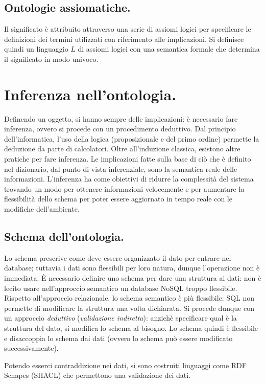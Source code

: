 \documentclass[11pt]{article}
\begin{document}
\begin{multicols}{2}
\subsection{Ontologie assiomatiche.}
Il significato è attribuito attraverso una serie di assiomi logici per specificare le definizioni dei termini utilizzati con riferimento alle implicazioni.
Si definisce quindi un linguaggio $L$ di assiomi logici con una semantica formale che determina il significato in modo univoco.

\section{Inferenza nell'ontologia.}
Definendo un oggetto, si hanno sempre delle implicazioni: è necessario fare inferenza, ovvero si procede con un procedimento deduttivo.
Dal principio dell'informatica, l'uso della logica (proposizionale e del primo ordine) permette la deduzione da parte di calcolatori.
Oltre all'induzione classica, esistono altre pratiche per fare inferenza.
Le implicazioni fatte sulla base di ciò che è definito nel dizionario, dal punto di vista inferenziale, sono la semantica reale delle informazioni.
L'inferenza ha come obiettivi di ridurre la complessità del sistema trovando un modo per ottenere informazioni velocemente e per aumentare la flessibilità dello schema per poter essere aggiornato in tempo reale con le modifiche dell'ambiente.

\subsection{Schema dell'ontologia.}
Lo schema prescrive come deve essere organizzato il dato per entrare nel database; tuttavia i dati sono flessibili per loro natura, dunque l'operazione non è immediata.
È necessario definire uno schema per dare una struttura ai dati: non è lecito usare nell'approccio semantico un database NoSQL troppo flessibile.
Rispetto all'approccio relazionale, lo schema semantico è più flessibile: SQL non permette di modificare la struttura una volta dichiarata.
Si procede dunque con un approccio \textit{deduttivo} (\textit{validazione indiretta}): anzichè specificare qual è la struttura del dato, si modifica lo schema al bisogno.
Lo schema quindi è flessibile e disaccoppia lo schema dai dati (ovvero lo schema può essere modificato successivamente).

Potendo esserci contraddizione nei dati, si sono costruiti linguaggi come RDF Schapes (SHACL) che permettono una validazione dei dati.


\end{multicols}
\end{document}
